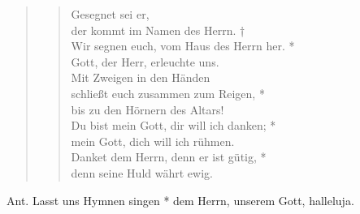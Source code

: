 \begin{quote}
\begin{verse}
\vin Gesegnet sei er,\\
\vin der kommt im Namen des Herrn. †\\ 
\vin Wir segnen euch, vom Haus des Herrn her. *\\
\vin Gott, der Herr, erleuchte uns.\\
Mit Zweigen in den Händen\\
schließt euch zusammen zum Reigen, *\\
bis zu den Hörnern des Altars!\\
\vin Du bist mein Gott, dir will ich danken; *\\
\vin mein Gott, dich will ich rühmen.\\
Danket dem Herrn, denn er ist gütig, *\\
denn seine Huld währt ewig.\\

\end{verse}
\end{quote}

\newpage

\def\greinitialformat#1{{\fontsize{40}{40}\selectfont #1}}
\gresetfirstlineaboveinitial{\textcolor{red}{Dan 3}}{}
\setaboveinitialseparation{0.72mm}
\smallskip

\begin{sloppypar}
{\noindent\rm{Ant. Lasst uns Hymnen singen * dem Herrn, unserem Gott, halleluja.}}
\end{sloppypar}

\medskip




